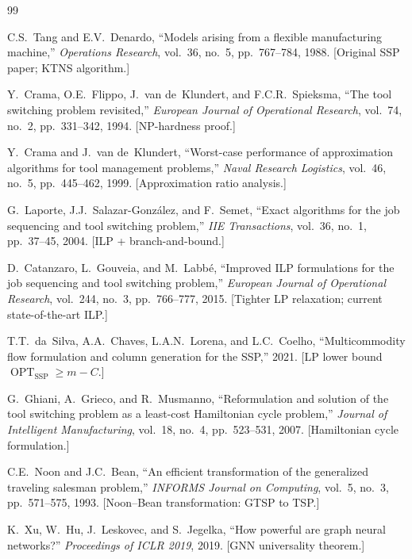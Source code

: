 \documentclass[11pt,a4paper]{article}
\theoremstyle{plain}
\theoremstyle{definition}
\DeclareMathOperator{\OPT}{OPT}
\begin{document}
\begin{thebibliography}{99}

C.S.~Tang and E.V.~Denardo,
``Models arising from a flexible manufacturing machine,''
\textit{Operations Research}, vol.~36, no.~5, pp.~767--784, 1988.
[Original SSP paper; KTNS algorithm.]

Y.~Crama, O.E.~Flippo, J.~van de~Klundert, and F.C.R.~Spieksma,
``The tool switching problem revisited,''
\textit{European Journal of Operational Research}, vol.~74, no.~2, pp.~331--342, 1994.
[NP-hardness proof.]

Y.~Crama and J.~van de~Klundert,
``Worst-case performance of approximation algorithms for tool management problems,''
\textit{Naval Research Logistics}, vol.~46, no.~5, pp.~445--462, 1999.
[Approximation ratio analysis.]

G.~Laporte, J.J.~Salazar-Gonz\'alez, and F.~Semet,
``Exact algorithms for the job sequencing and tool switching problem,''
\textit{IIE Transactions}, vol.~36, no.~1, pp.~37--45, 2004.
[ILP + branch-and-bound.]

D.~Catanzaro, L.~Gouveia, and M.~Labb\'e,
``Improved ILP formulations for the job sequencing and tool switching problem,''
\textit{European Journal of Operational Research}, vol.~244, no.~3, pp.~766--777, 2015.
[Tighter LP relaxation; current state-of-the-art ILP.]

T.T.~da~Silva, A.A.~Chaves, L.A.N.~Lorena, and L.C.~Coelho,
``Multicommodity flow formulation and column generation for the SSP,'' 2021.
[LP lower bound $\OPT_{\text{SSP}} \ge m - C$.]

G.~Ghiani, A.~Grieco, and R.~Musmanno,
``Reformulation and solution of the tool switching problem as a least-cost Hamiltonian
cycle problem,''
\textit{Journal of Intelligent Manufacturing}, vol.~18, no.~4, pp.~523--531, 2007.
[Hamiltonian cycle formulation.]

C.E.~Noon and J.C.~Bean,
``An efficient transformation of the generalized traveling salesman problem,''
\textit{INFORMS Journal on Computing}, vol.~5, no.~3, pp.~571--575, 1993.
[Noon--Bean transformation: GTSP to TSP.]

K.~Xu, W.~Hu, J.~Leskovec, and S.~Jegelka,
``How powerful are graph neural networks?''
\textit{Proceedings of ICLR 2019}, 2019.
[GNN universality theorem.]


\end{thebibliography}
\end{document}
